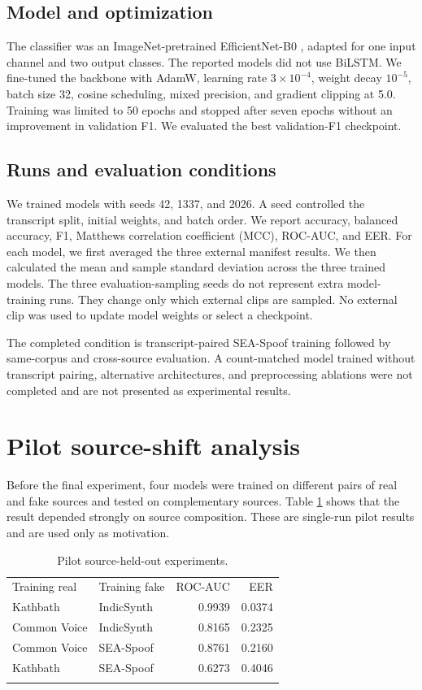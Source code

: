 \documentclass[3p,times,procedia]{elsarticle}
\begin{document}
\subsection{Model and optimization}
The classifier was an ImageNet-pretrained EfficientNet-B0
\cite{tan2019efficientnet}, adapted for one input channel and two output
classes. The reported models did not use BiLSTM. We fine-tuned the backbone
with AdamW, learning rate $3\times10^{-4}$, weight decay $10^{-5}$, batch
size 32, cosine scheduling, mixed precision, and gradient clipping at 5.0.
Training was limited to 50 epochs and stopped after seven epochs without an
improvement in validation F1. We evaluated the best validation-F1 checkpoint.

\subsection{Runs and evaluation conditions}
We trained models with seeds 42, 1337, and 2026. A seed controlled the
transcript split, initial weights, and batch order. We report accuracy,
balanced accuracy, F1, Matthews correlation coefficient (MCC), ROC-AUC, and
EER. For each model, we first averaged the three external manifest results.
We then calculated the mean and sample standard deviation across the three
trained models. The three evaluation-sampling seeds do not represent extra
model-training runs. They change only which external clips are sampled. No
external clip was used to update model weights or select a checkpoint.

The completed condition is transcript-paired SEA-Spoof training followed by
same-corpus and cross-source evaluation. A count-matched model trained
without transcript pairing, alternative architectures, and preprocessing
ablations were not completed and are not presented as experimental results.

\section{Pilot source-shift analysis}
Before the final experiment, four models were trained on different pairs of
real and fake sources and tested on complementary sources. Table
\ref{tab:pilot} shows that the result depended strongly on source
composition. These are single-run pilot results and are used only as
motivation.

\begin{table}[h]
\caption{Pilot source-held-out experiments.}
\label{tab:pilot}
\begin{tabular*}{\hsize}{@{\extracolsep{\fill}}llrr@{}}
\toprule
Training real & Training fake & ROC-AUC & EER \\
\colrule
Kathbath & IndicSynth & 0.9939 & 0.0374 \\
Common Voice & IndicSynth & 0.8165 & 0.2325 \\
Common Voice & SEA-Spoof & 0.8761 & 0.2160 \\
Kathbath & SEA-Spoof & 0.6273 & 0.4046 \\
\botrule
\end{tabular*}
\end{table}
\end{document}
